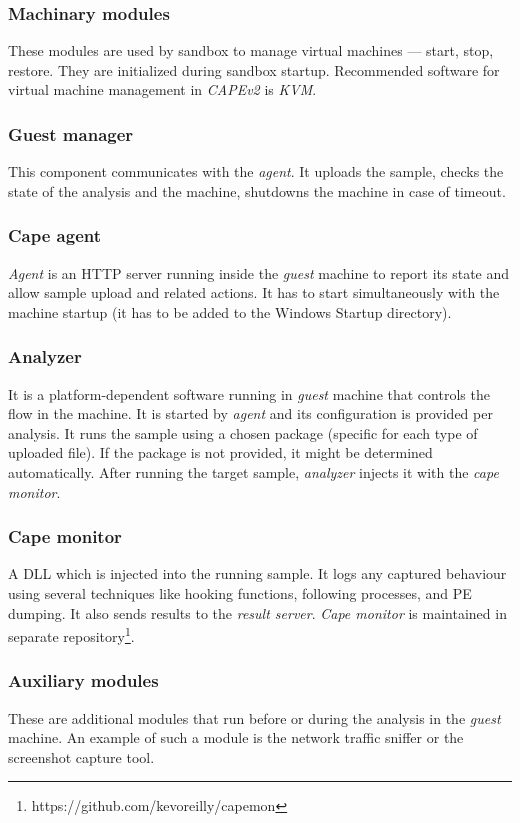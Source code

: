 \subsubsection*{Machinary modules}
These modules are used by sandbox to manage virtual machines --- start, stop, restore. They are initialized during sandbox startup. Recommended  software for virtual machine management in \emph{CAPEv2} is \emph{KVM}.

\subsubsection*{Guest manager}
This component communicates with the \emph{agent}. It uploads the sample, checks the state of the analysis and the machine, shutdowns the machine in case of timeout.

\subsubsection*{Cape agent}
\emph{Agent} is an HTTP server running inside the \emph{guest} machine to report its state and allow sample upload and related actions. It has to start simultaneously with the machine startup (it has to be added to the Windows Startup directory).

\subsubsection*{Analyzer}
It is a platform-dependent software running in \emph{guest} machine that controls the flow in the machine. It is started by \emph{agent} and its configuration is provided per analysis. It runs the sample using a chosen package (specific for each type of uploaded file). If the package is not provided, it might be determined automatically. After running the target sample, \emph{analyzer} injects it with the \emph{cape monitor}.

\subsubsection*{Cape monitor}
A DLL which is injected into the running sample. It logs any captured behaviour using several techniques like hooking functions, following processes, and PE dumping. It also sends results to the \emph{result server}. \emph{Cape monitor} is maintained in separate repository\footnote{https://github.com/kevoreilly/capemon}.

\subsubsection*{Auxiliary modules}
These are additional modules that run before or during the analysis in the \emph{guest} machine. An example of such a module is the network traffic sniffer or the screenshot capture tool.

